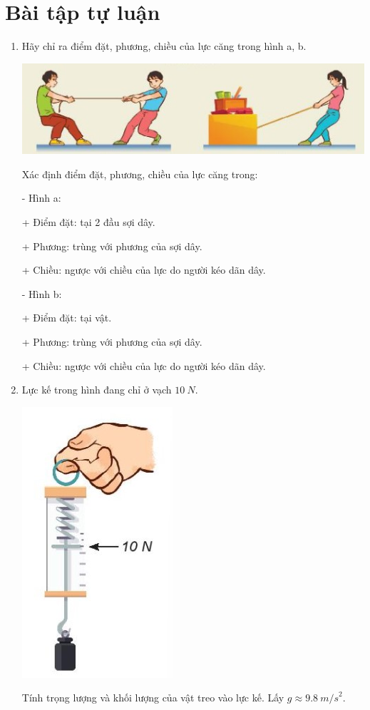 \section{Bài tập tự luận}
\begin{enumerate}[label=\bfseries Bài \arabic*:,leftmargin=1.5cm]
	\item {}
	
	
	{Hãy chỉ ra điểm đặt, phương, chiều của lực căng trong hình a, b.
		\begin{center}
			\includegraphics[scale=1]{../figs/VN10-2022-PH-TP019-3.jpg}
		\end{center}
	}
	
	\hideall
	{
		Xác định điểm đặt, phương, chiều của lực căng trong:
		
		- Hình a:
		
		+ Điểm đặt: tại 2 đầu sợi dây.
		
		+ Phương: trùng với phương của sợi dây.
		
		+ Chiều: ngược với chiều của lực do người kéo dãn dây.
		
		- Hình b:
		
		+ Điểm đặt: tại vật.
		
		+ Phương: trùng với phương của sợi dây.
		
		+ Chiều: ngược với chiều của lực do người kéo dãn dây.
		
	}
	\item {}
	
	{
		Lực kế trong hình đang chỉ ở vạch $\SI{10}{N}$.
		\begin{center}
			\includegraphics[scale=0.8]{../figs/VN10-2022-PH-TP019-1.jpg}
		\end{center}
		Tính trọng lượng và khối lượng của vật treo vào lực kế. Lấy $g \approx \SI{9,8}{m/s}^2$.
		
}
\end{enumerate}
